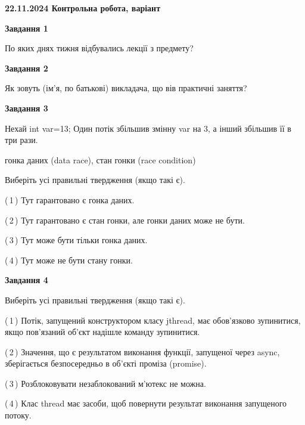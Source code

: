 \documentclass[12pt, ukrainian]{article}
\begin{document}
\begin {large}

\textbf{22.11.2024 Контрольна робота, варіант  }\par


{

\begin{center}
\textbf{Завдання 1}
\end{center}

По яких днях тижня відбувались лекції з предмету?


\begin{center}
\textbf{Завдання 2}
\end{center}

Як зовуть (ім'я, по батькові) викладача, що вів практичні заняття?


\begin{center}
\textbf{Завдання 3}
\end{center}

Нехай int var=13; Один потік збільшив змінну var на 3, а інший збільшив її в три рази.

гонка даних (data race), стан гонки (race condition)

Виберіть усі правильні твердження (якщо такі є).\par
\vspace{2mm}
(\,1\,) Тут гарантовано є гонка даних.%

(\,2\,) Тут гарантовано є стан гонки, але гонки даних може не бути.%

(\,3\,) Тут може бути тільки гонка даних.%

(\,4\,) Тут може не бути стану гонки.%


\begin{center}
\textbf{Завдання 4}
\end{center}

Виберіть усі правильні твердження (якщо такі є).\par
\vspace{2mm}

(\,1\,) Потік, запущений конструктором класу jthread, має обов’язково зупинитися, якщо пов’язаний об’єкт надішле команду зупинитися.%

(\,2\,) Значення, що є результатом виконання функції, запущеної через async, зберігається безпосередньо в об’єкті проміза (promise).%

(\,3\,) Розблоковувати незаблокований м’ютекс не можна.%

(\,4\,) Клас thread має засоби, щоб повернути результат виконання запущеного потоку.%


}
\end{large}
\end{document}
